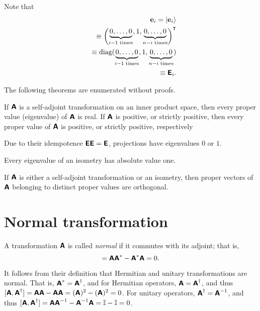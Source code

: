 {Note that
\begin{equation}
\begin{split}
{\bf e}_i=\vert {\bf e}_i \rangle  \\
\quad \equiv \begin{pmatrix} \underbrace{0,\ldots , 0}_{i-1 \textrm{ times}}, 1, \underbrace{0,\ldots , 0}_{n-i \textrm{ times}} \end{pmatrix}^\intercal    \\
\quad \equiv  \textrm{diag}(  \underbrace{0,\ldots , 0}_{i-1 \textrm{ times}}, 1, \underbrace{0,\ldots , 0}_{n-i \textrm{ times}}  )
  \\
\quad \equiv  \textsf{\textbf{E}}_{i}.
\end{split}
\end{equation}
{\textrm{\eexample}}
}


The following theorems are enumerated without proofs.

If $\textsf{\textbf{A}}$
is a self-adjoint transformation on an inner product space, then every proper value (eigenvalue)  of $\textsf{\textbf{A}}$
is real.
If $\textsf{\textbf{A}}$ is positive, or strictly positive,
then every proper value of  $\textsf{\textbf{A}}$ is positive, or strictly positive, respectively

Due to their idempotence $\textsf{\textbf{E}}\textsf{\textbf{E}}=\textsf{\textbf{E}}$,
projections have eigenvalues $0$ or $1$.

Every eigenvalue of an isometry has absolute value one.

If  $\textsf{\textbf{A}}$  is either a self-adjoint transformation or an isometry,
then proper vectors of $ \textsf{\textbf{A}}$
belonging to distinct proper values are orthogonal.


\section{Normal transformation}
\label{2014-m-fdvs-normality}

A transformation $\textsf{\textbf{A}}$ is called {\em normal}
if it commutes with its adjoint; that is,
\begin{equation}
[\textsf{\textbf{A}},\textsf{\textbf{A}}^\ast ]= \textsf{\textbf{A}}\textsf{\textbf{A}}^\ast  -
\textsf{\textbf{A}}^\ast  \textsf{\textbf{A}} =0.
\end{equation}


It follows from their definition that Hermitian and unitary transformations are normal. That is,
$\textsf{\textbf{A}}^\ast =\textsf{\textbf{A}}^\dagger$,
and for Hermitian operators,
$\textsf{\textbf{A}}=\textsf{\textbf{A}}^\dagger$,
and thus
$[\textsf{\textbf{A}},\textsf{\textbf{A}}^\dagger]= \textsf{\textbf{A}}\textsf{\textbf{A}} -
\textsf{\textbf{A}} \textsf{\textbf{A}} =(\textsf{\textbf{A}})^2 -(\textsf{\textbf{A}})^2=0$.
For unitary operators,
$\textsf{\textbf{A}}^\dagger =\textsf{\textbf{A}}^{-1}$,
and thus
$[\textsf{\textbf{A}},\textsf{\textbf{A}}^\dagger]= \textsf{\textbf{A}}\textsf{\textbf{A}}^{-1} -
\textsf{\textbf{A}}^{-1} \textsf{\textbf{A}} ={\Bbb I} -{\Bbb I} =0$.


